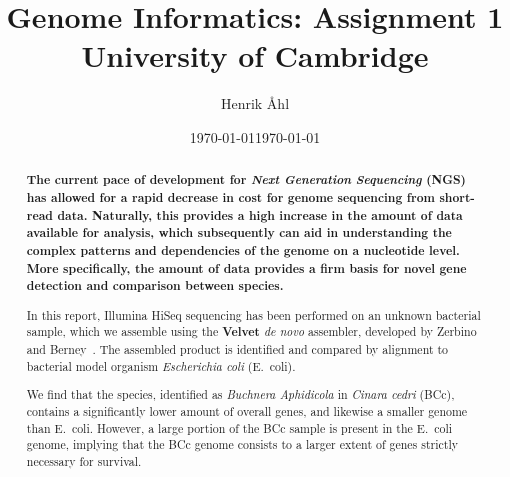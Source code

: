 \documentclass[10pt]{article}\usepackage[]{graphicx}\usepackage[]{color}
\title
{
  \phantom{a}\vspace{2cm}
	\textbf
	{
      Genome Informatics: Assignment 1
  }\\[1em]
  \small{University of Cambridge}
}
\author{Henrik Åhl}
\date{\today}
\theoremstyle{plain}
\theoremstyle{definition}
\begin{document}
\date{\today}
\maketitle
\thispagestyle{empty}

\newpage
\setcounter{page}{1}
\begin{abstract}
\begin{changemargin}{-.8cm}{-.8cm}
{\bf
The current pace of development for \textit{Next Generation Sequencing} (NGS) has allowed for a rapid decrease in cost for genome sequencing from short-read data. Naturally, this provides a high increase in the amount of data available for analysis, which subsequently can aid in understanding the complex patterns and dependencies of the genome on a nucleotide level. More specifically, the amount of data provides a firm basis for novel gene detection and comparison between species.

\hspace{.5cm}In this report, Illumina HiSeq sequencing has been performed on an unknown bacterial sample, which we assemble using the \textbf{Velvet} \textit{de novo} assembler, developed by Zerbino and Berney~\cite{Zerbino08}. The assembled product is identified and compared by alignment to bacterial model organism \textit{Escherichia coli} (E.\ coli). 

\hspace{.5cm}We find that the species, identified as \textit{Buchnera Aphidicola} in \textit{Cinara cedri} (BCc), contains a significantly lower amount of overall genes, and likewise a smaller genome than E.\ coli. However, a large portion of the BCc sample is present in the E.\ coli genome, implying that the BCc genome consists to a larger extent of genes strictly necessary for survival. 
}
\end{changemargin} 
\end{abstract}
\end{document}
